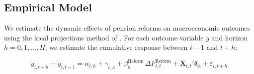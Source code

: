 \documentclass[11pt,english,a4paper, twoside, authoryear]{article}
\begin{document}

\subsection{Empirical Model}
\label{sec:model}

We estimate the dynamic effects of pension reforms on macroeconomic outcomes using the local projections method of \citet{Jorda2005}. For each outcome variable $y$ and horizon $h = 0, 1, \ldots, H$, we estimate the cumulative response between $t-1$ and $t+h$:

\begin{equation}
\label{eq:lp}
y_{i,t+h} - y_{i,t-1} = \alpha_{i,h} + \gamma_{t,h}
+ \beta^{\text{Reform}}_h \, \Delta F^{\text{Reform}}_{i,t}
+ \mathbf{X}_{i,t}' \boldsymbol{\delta}_h
+ \varepsilon_{i,t+h}
\end{equation}
\end{document}
